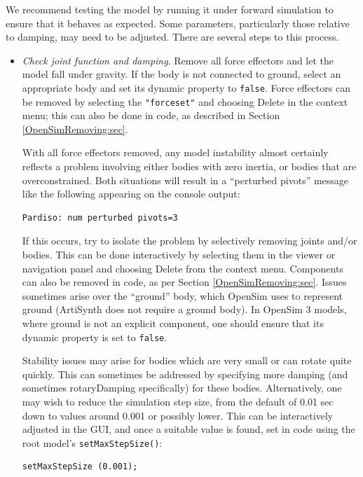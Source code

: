 We recommend testing the model by running it under forward simulation to ensure
that it behaves as expected. Some parameters, particularly those relative to
damping, may need to be adjusted.  There are several steps to this process.

\begin{itemize}

\item {\it Check joint function and damping}. Remove all force effectors and
let the model fall under gravity. If the body is not connected to ground,
select an appropriate body and set its {\sf dynamic} property to {\tt false}.
Force effectors can be removed by selecting the {\tt "forceset"} and choosing
{\sf Delete} in the context menu; this can also be done in code, as described
in Section \ref{OpenSimRemoving:sec}. 

\begin{sideblock}
With all force effectors removed, any model instability almost certainly
reflects a problem involving either bodies with zero inertia, or bodies that
are overconstrained. Both situations will result in a ``perturbed pivots''
message like the following appearing on the console output:
%
\begin{verbatim}
Pardiso: num perturbed pivots=3
\end{verbatim}
%
If this occurs, try to isolate the problem by selectively removing joints
and/or bodies. This can be done interactively by selecting them in the viewer
or navigation panel and choosing {\sf Delete} from the context menu.
Components can also be removed in code, as per
Section \ref{OpenSimRemoving:sec}.  Issues sometimes arise over the ``ground''
body, which OpenSim uses to represent ground (ArtiSynth does not require a
ground body). In OpenSim 3 models, where ground is not an explicit component,
one should ensure that its {\sf dynamic} property is set to {\tt false}.
\end{sideblock}

\begin{sideblock}
Stability issues may arise for bodies which are very small or can rotate quite
quickly. This can sometimes be addressed by specifying more damping (and
sometimes {\sf rotaryDamping} specifically) for these bodies. Alternatively,
one may wish to reduce the simulation step size, from the default of 0.01 sec
down to values around 0.001 or possibly lower. This can be interactively
adjusted in the GUI, and once a suitable value is found, set in code using the
root model's {\tt setMaxStepSize()}:
%
\begin{lstlisting}[]
   setMaxStepSize (0.001);
\end{lstlisting}
%
\end{sideblock}


\end{itemize}
